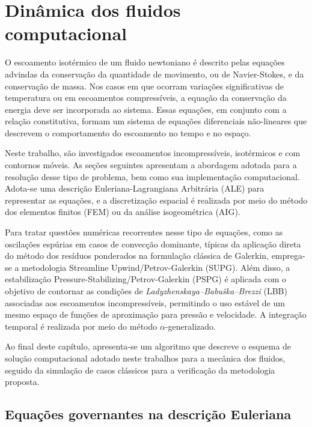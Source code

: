 \chapter[Dinâmica dos fluidos computacional]{Dinâmica dos fluidos computacional}
\label{capitulo:Cap2}

O escoamento isotérmico de um fluido newtoniano é descrito pelas equações advindas da conservação da quantidade de movimento, ou de Navier-Stokes, e da conservação de massa. Nos casos em que ocorram variações significativas de temperatura ou em escoamentos compressíveis, a equação da conservação da energia deve ser incorporada ao sistema. Essas equações, em conjunto com a relação constitutiva, formam um sistema de equações diferenciais não-lineares que descrevem o comportamento do escoamento no tempo e no espaço. 

Neste trabalho, são investigados escoamentos incompressíveis, isotérmicos e com contornos móveis. As seções seguintes apresentam a abordagem adotada para a resolução desse tipo de problema, bem como sua implementação computacional. Adota-se uma descrição Euleriana-Lagrangiana Arbitrária (ALE) para representar as equações, e a discretização espacial é realizada por meio do método dos elementos finitos (FEM) ou da análise isogeométrica (AIG).

Para tratar questões numéricas recorrentes nesse tipo de equações, como as oscilações espúrias em casos de convecção dominante, típicas da aplicação direta do método dos resíduos ponderados na formulação clássica de Galerkin, emprega-se a metodologia Streamline Upwind/Petrov-Galerkin (SUPG). Além disso, a estabilização Pressure-Stabilizing/Petrov-Galerkin (PSPG) é aplicada com o objetivo de contornar as condições de \textit{Ladyzhenskaya–Babuška–Brezzi} (LBB) associadas aos escoamentos incompressíveis, permitindo o uso estável de um mesmo espaço de funções de aproximação para pressão e velocidade. A integração temporal é realizada por meio do método $\alpha$-generalizado.

Ao final deste capítulo, apresenta-se um algoritmo que descreve o esquema de solução computacional adotado neste trabalhos para a mecânica dos fluidos, seguido da simulação de casos clássicos para a verificação da metodologia proposta.

\section{Equações governantes na descrição Euleriana} 

